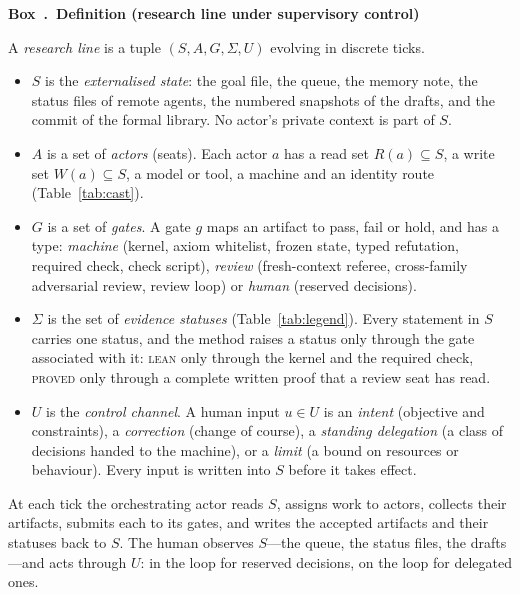 \documentclass[11pt]{article}
\newcounter{protocolbox}
\newenvironment{protocol}[1]{\refstepcounter{protocolbox}\begin{framed}\noindent\textbf{Box~\theprotocolbox.\ #1}\par\small}{\end{framed}}
\begin{document}
\begin{protocol}{Definition (research line under supervisory control)}
\label{box:model}
A \emph{research line} is a tuple $(S, A, G, \Sigma, U)$ evolving in discrete
ticks.
\begin{itemize}[leftmargin=*,itemsep=1pt]
\item $S$ is the \emph{externalised state}: the goal file, the queue, the
memory note, the status files of remote agents, the numbered snapshots of the
drafts, and the commit of the formal library. No actor's private context is
part of $S$.
\item $A$ is a set of \emph{actors} (seats). Each actor $a$ has a read set
$R(a)\subseteq S$, a write set $W(a)\subseteq S$, a model or tool, a machine
and an identity route (Table~\ref{tab:cast}).
\item $G$ is a set of \emph{gates}. A gate $g$ maps an artifact to
\textsf{pass}, \textsf{fail} or \textsf{hold}, and has a type: \emph{machine}
(kernel, axiom whitelist, frozen state, typed refutation, required check,
check script), \emph{review} (fresh-context referee, cross-family adversarial
review, review loop) or \emph{human} (reserved decisions).
\item $\Sigma$ is the set of \emph{evidence statuses}
(Table~\ref{tab:legend}). Every statement in $S$ carries one status, and the
method raises a status only through the gate associated with it:
\textsc{lean} only through the kernel and the required check,
\textsc{proved} only through a complete written proof that a review seat has
read.
\item $U$ is the \emph{control channel}. A human input $u\in U$ is an
\emph{intent} (objective and constraints), a \emph{correction} (change of
course), a \emph{standing delegation} (a class of decisions handed to the
machine), or a \emph{limit} (a bound on resources or behaviour). Every input
is written into $S$ before it takes effect.
\end{itemize}
At each tick the orchestrating actor reads $S$, assigns work to actors,
collects their artifacts, submits each to its gates, and writes the accepted
artifacts and their statuses back to $S$. The human observes $S$---the queue,
the status files, the drafts---and acts through $U$: in the loop for reserved
decisions, on the loop for delegated ones.
\end{protocol}
\end{document}
